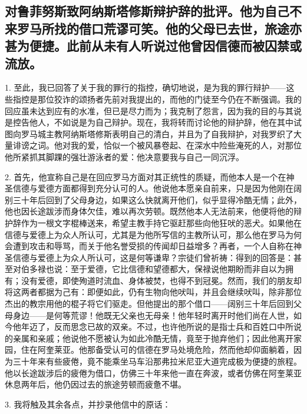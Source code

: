 \subsection{对鲁菲努斯致阿纳斯塔修斯辩护辞的批评。他为自己不来罗马所找的借口荒谬可笑。他的父母已去世，旅途亦甚为便捷。此前从未有人听说过他曾因信德而被囚禁或流放。}

1. 至此，我已回答了关于我的罪行的指控，确切地说，是为我的罪行辩护——这些指控是那位狡诈的颂扬者先前对我提出的，而他的门徒至今仍在不断强调。我的回应虽未达到应有的水准，但已是尽力而为；我克制了怨言，因为我的目的与其说是控告他人，不如说是为自己辩护。现在，我将转而讨论他的辩护辞，他在其中试图向罗马城主教阿纳斯塔修斯表明自己的清白，并且为了自我辩护，对我罗织了大量诽谤之词。他对我的爱，恰似一个被风暴卷起、在深水中险些淹死的人，对那位他所紧抓其脚踝的强壮游泳者的爱：他决意要我与自己一同沉浮。\par

2. 首先，他宣称自己是在回应罗马方面对其正统性的质疑，而他本人是一个在神圣信德与爱德方面都得到充分认可的人。他说他本愿亲自前来，只是因为他刚在阔别三十年后回到了父母身边，如果这么快就离开他们，似乎显得冷酷无情；此外，他也因长途跋涉而身体欠佳，难以再次劳顿。既然他本人无法前来，他便将他的辩护辞作为一根文字棍棒送来，希望主教手持它驱赶那些向他狂吠的恶犬。如果他在信德与爱德上为众人所认可，尤其是为他所写信的主教所认可，那么他在罗马为何会遭到攻击和辱骂，而关于他名誉受损的传闻却日益增多？再者，一个人自称在神圣信德与爱德上为众人所认可，这是何等谦卑？宗徒们曾祈祷：得到的回答是：甚至对伯多禄也说：至于爱德，它比信德和望德都大，保禄说他期盼而非自以为拥有；没有爱德，即使殉道时流血、身体被焚，也得不到冠冕。然而，我们的朋友却将这两者都据为己有：即便如此，仍有生物向他吠叫，并且会继续吠叫，除非那位杰出的教宗用他的棍子将它们驱走。但他提出的那个借口——阔别三十年后回到父母身边——是何等荒谬！他既无父亲也无母亲！他年轻时离开时他们尚在人世，如今他年迈了，反而思念已故的双亲。不过，也许他所说的是指士兵和百姓口中所说的亲属和亲戚；他说他不愿被认为如此冷酷无情，竟至于抛弃他们；因此他离开家园，住在阿奎莱亚。他那备受认可的信德在罗马处境危险，然而他却仰面躺着，因为三十年来有些疲倦，竟不能乘坐马车沿那弗拉米尼亚大道完成极为便捷的旅程。他以长途跋涉后的疲倦为借口，仿佛三十年来他一直在奔波，或者仿佛在阿奎莱亚休息两年后，他仍因过去的旅途劳顿而疲惫不堪。\par

3. 我将触及其余各点，并抄录他信中的原话：\par

